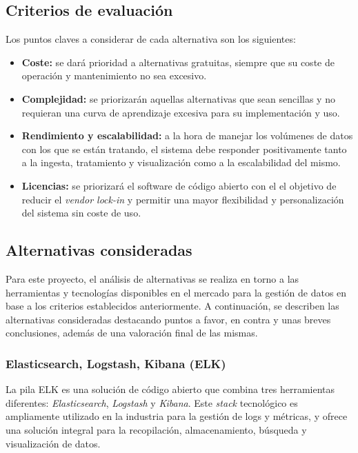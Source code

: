 \subsection{Criterios de evaluación}
Los puntos claves a considerar de cada alternativa son los siguientes:

\begin{itemize}
	\item \textbf{Coste:} se dará prioridad a alternativas gratuitas, siempre
		que su coste de operación y mantenimiento no sea excesivo.
	\item \textbf{Complejidad:} se priorizarán aquellas alternativas que
		sean sencillas y no requieran una curva de aprendizaje excesiva para
		su implementación y uso.
	\item \textbf{Rendimiento y escalabilidad:} a la hora de manejar los
		volúmenes de datos con los que se están tratando, el sistema debe
		responder positivamente tanto a la ingesta, tratamiento y visualización
		como a la escalabilidad del mismo.
	\item \textbf{Licencias:} se priorizará el software de código abierto con el
		el objetivo de reducir el \textit{vendor lock-in} y permitir una mayor
		flexibilidad y personalización del sistema sin coste de uso.
\end{itemize}


\newpage{}
\subsection{Alternativas consideradas}
Para este proyecto, el análisis de alternativas se realiza en torno a las
herramientas y tecnologías disponibles en el mercado para la gestión de datos en
base a los criterios establecidos anteriormente. A continuación, se describen
las alternativas consideradas destacando puntos a favor, en contra y unas
breves conclusiones, además de una valoración final de las mismas.


\subsubsection{Elasticsearch, Logstash, Kibana (ELK)}
La pila ELK es una solución de código abierto que combina tres herramientas
diferentes: \textit{Elasticsearch}, \textit{Logstash} y \textit{Kibana}. Este
\textit{stack} tecnológico es ampliamente utilizado en la industria para la
gestión de logs y métricas, y ofrece una solución integral para la recopilación,
almacenamiento, búsqueda y visualización de datos.

